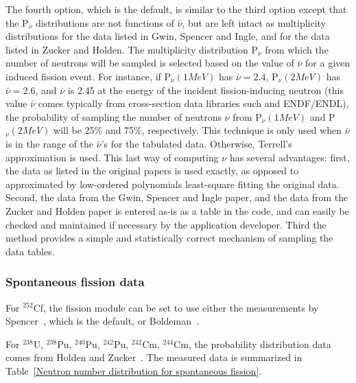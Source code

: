 \documentclass[11pt]{article}
\newcommand{\notgeant}[1]{}%
\begin{document}
The fourth option, which is the default\notgeant{ ({\tt nudist=3})},
is similar to the third option except that the P$_{\nu}$ distributions
are not functions of $\bar{\nu}$, but are left intact as multiplicity
distributions for the data listed in Gwin, Spencer and
Ingle, and for the data listed in Zucker and
Holden. The multiplicity distribution P$_{\nu}$ from which the number
of neutrons will be sampled is selected based on the value of
$\bar{\nu}$ for a given induced fission event.  For instance, if
P$_{\nu}(1 MeV)$ has $\bar{\nu}=2.4$, P$_{\nu}(2 MeV)$ has
$\bar{\nu}=2.6$, and $\bar{\nu}$ is 2.45 at the energy of the incident
fission-inducing neutron (this value $\bar{\nu}$ comes typically from
cross-section data libraries such and ENDF/ENDL), the probability of
sampling the number of neutrons ${\nu}$ from P$_{\nu}(1 MeV)$ and
P$_{\nu}(2 MeV)$ will be 25\% and 75\%, respectively. This technique
is only used when $\bar{\nu}$ is in the range of the $\bar{\nu}$'s for
the tabulated data. Otherwise, Terrell's approximation is used.  This
last way of computing ${\nu}$ has several advantages: first, the data
as listed in the original papers is used exactly, as opposed to
approximated by low-ordered polynomials least-square fitting the
original data. Second, the data from the Gwin, Spencer and
Ingle paper, and the data from the Zucker and Holden paper is
entered as-is as a table in the code, and can easily be checked and
maintained if necessary by the application developer. Third the method
provides a simple and statistically correct mechanism of sampling the
data tables. \notgeant{The fission module behaves in this
manner when the 'nudist' option is set to 3, which is also the default
behavior.}

\subsubsection*{Spontaneous fission data}

For $^{252}$Cf, the fission module can be set to use either the
measurements by Spencer~\cite{Spencer 1982}\notgeant{ ({\tt ndist=0})},
which is the default,
or Boldeman~\cite{Boldeman 1985}\notgeant{ ({\tt ndist=1})}.

For $^{238}$U, $^{238}$Pu, $^{240}$Pu, $^{242}$Pu, $^{242}$Cm,
$^{244}$Cm, the probability distribution data comes from Holden and
Zucker~\cite{Holden and Zucker BNL}. The measured data is summarized
in Table~\ref{Neutron number distribution for spontaneous fission}.
\end{document}
